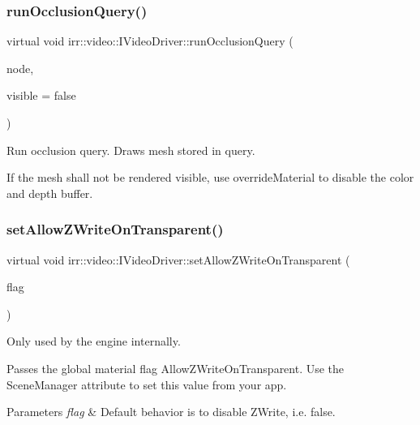 \subsubsection{\texorpdfstring{run\+Occlusion\+Query()}{runOcclusionQuery()}}
{\footnotesize\ttfamily virtual void irr\+::video\+::\+I\+Video\+Driver\+::run\+Occlusion\+Query (\begin{DoxyParamCaption}\item[{\hyperlink{classirr_1_1scene_1_1ISceneNode}{scene\+::\+I\+Scene\+Node} $\ast$}]{node,  }\item[{bool}]{visible = {\ttfamily false} }\end{DoxyParamCaption})\hspace{0.3cm}{\ttfamily [pure virtual]}}



Run occlusion query. Draws mesh stored in query. 

If the mesh shall not be rendered visible, use override\+Material to disable the color and depth buffer. \mbox{\label{classirr_1_1video_1_1IVideoDriver_af78022589e5b7cb42b4d6ed2f7950e42}} 
\subsubsection{\texorpdfstring{set\+Allow\+Z\+Write\+On\+Transparent()}{setAllowZWriteOnTransparent()}}
{\footnotesize\ttfamily virtual void irr\+::video\+::\+I\+Video\+Driver\+::set\+Allow\+Z\+Write\+On\+Transparent (\begin{DoxyParamCaption}\item[{bool}]{flag }\end{DoxyParamCaption})\hspace{0.3cm}{\ttfamily [pure virtual]}}



Only used by the engine internally. 

Passes the global material flag Allow\+Z\+Write\+On\+Transparent. Use the Scene\+Manager attribute to set this value from your app. 
\begin{DoxyParams}{Parameters}
{\em flag} & Default behavior is to disable Z\+Write, i.\+e. false. \\
\hline
\end{DoxyParams}
\mbox{\label{classirr_1_1video_1_1IVideoDriver_aaba8d96a8061264393fc74ac9a3cd04f}} 
